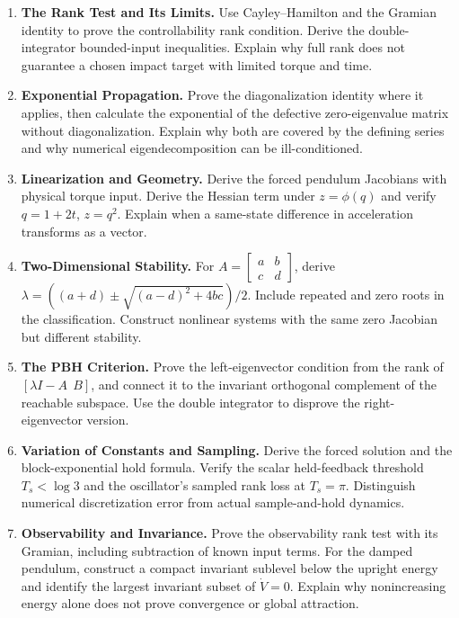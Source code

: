 \begin{enumerate}
\item \textbf{The Rank Test and Its Limits.} Use Cayley--Hamilton and the Gramian identity to prove the controllability rank condition. Derive the double-integrator bounded-input inequalities. Explain why full rank does not guarantee a chosen impact target with limited torque and time.
\item \textbf{Exponential Propagation.} Prove the diagonalization identity where it applies, then calculate the exponential of the defective zero-eigenvalue matrix without diagonalization. Explain why both are covered by the defining series and why numerical eigendecomposition can be ill-conditioned.
\item \textbf{Linearization and Geometry.} Derive the forced pendulum Jacobians with physical torque input. Derive the Hessian term under $z=\phi(q)$ and verify $q=1+2t$, $z=q^2$. Explain when a same-state difference in acceleration transforms as a vector.
\item \textbf{Two-Dimensional Stability.} For $A=\left[\begin{smallmatrix}a&b\\c&d\end{smallmatrix}\right]$, derive $\lambda=((a+d)\pm\sqrt{(a-d)^2+4bc})/2$. Include repeated and zero roots in the classification. Construct nonlinear systems with the same zero Jacobian but different stability.
\item \textbf{The PBH Criterion.} Prove the left-eigenvector condition from the rank of $[\lambda I-A\ \ B]$, and connect it to the invariant orthogonal complement of the reachable subspace. Use the double integrator to disprove the right-eigenvector version.
\item \textbf{Variation of Constants and Sampling.} Derive the forced solution and the block-exponential hold formula. Verify the scalar held-feedback threshold $T_s<\log3$ and the oscillator's sampled rank loss at $T_s=\pi$. Distinguish numerical discretization error from actual sample-and-hold dynamics.
\item \textbf{Observability and Invariance.} Prove the observability rank test with its Gramian, including subtraction of known input terms. For the damped pendulum, construct a compact invariant sublevel below the upright energy and identify the largest invariant subset of $\dot V=0$. Explain why nonincreasing energy alone does not prove convergence or global attraction.
\end{enumerate}
